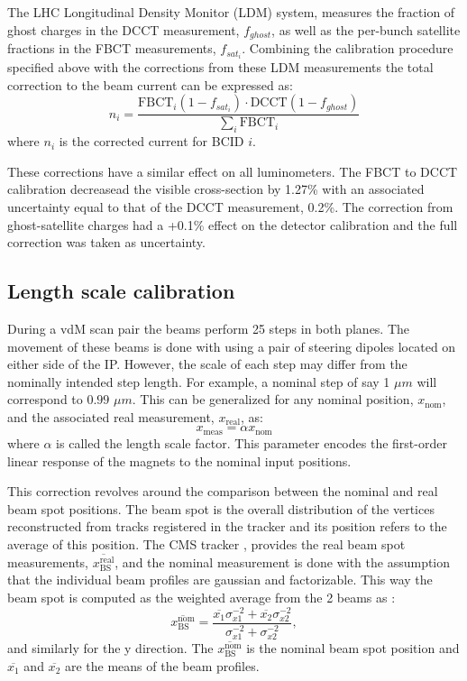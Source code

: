 The LHC Longitudinal Density Monitor (LDM) system, measures the fraction of ghost charges in the DCCT measurement, $f_{ghost}$, as well as the per-bunch satellite fractions in the FBCT measurements, $f_{sat_i}$. Combining the calibration procedure specified above with the corrections from these LDM measurements the total correction to the beam current can be expressed as:
\begin{equation}
	n_{i} = \frac{\mathrm{FBCT}_i \left( 1 - f_{sat_i} \right) \cdot \mathrm{DCCT} \left( 1 - f_{ghost} \right)}{\sum_i \mathrm{FBCT}_i}
\end{equation}
where $n_{i}$ is the corrected current for BCID $i$.

These corrections have a similar effect on all luminometers. The FBCT to DCCT calibration decreasead the visible cross-section by 1.27\% with an associated uncertainty equal to that of the DCCT measurement, 0.2\%. The correction from ghost-satellite charges had a +0.1\% effect on the detector calibration and the full correction was taken as uncertainty.

\subsection{Length scale calibration}

During a vdM scan pair the beams perform 25 steps in both planes. The movement of these beams is done with using a pair of steering dipoles located on either side of the IP. However, the scale of each step may differ from the nominally intended step length. For example, a nominal step of say 1 $\mu m$ will correspond to $0.99$ $\mu m$. This can be generalized for any nominal position, $x_{\mathrm{nom}}$, and the associated real measurement, $x_{\mathrm{real}}$, as:
\begin{equation}
	x_{\mathrm{meas}} = \alpha x_{\mathrm{nom}}
\end{equation}
where $\alpha$ is called the length scale factor. This parameter encodes the first-order linear response of the magnets to the nominal input positions.

This correction revolves around the comparison between the nominal and real beam spot positions. The beam spot is the overall distribution of the vertices reconstructed from tracks registered in the tracker and its position refers to the average of this position. The CMS tracker \cite{Sirunyan:2759951}, provides the real beam spot measurements, $\overline{x^{\mathrm{real}}_{\mathrm{BS}}}$,  and the nominal measurement is done with the assumption that the individual beam profiles are gaussian and factorizable. This way the beam spot is computed as the weighted average from the 2 beams as \cite{CMS-PAS-LUM-22-001}:
\begin{equation}
	\overline{x^{\mathrm{nom}}_{\mathrm{BS}}} = \frac{\overline{x_1}\sigma_{x1}^{-2} + \overline{x_2}\sigma_{x2}^{-2}}{\sigma_{x1}^{-2} + \sigma_{x2}^{-2}},
\end{equation}
and similarly for the y direction. The $\overline{x^{\mathrm{nom}}_{\mathrm{BS}}}$ is the nominal beam spot position and $\overline{x_1}$ and $\overline{x_2}$ are the means of the beam profiles.

